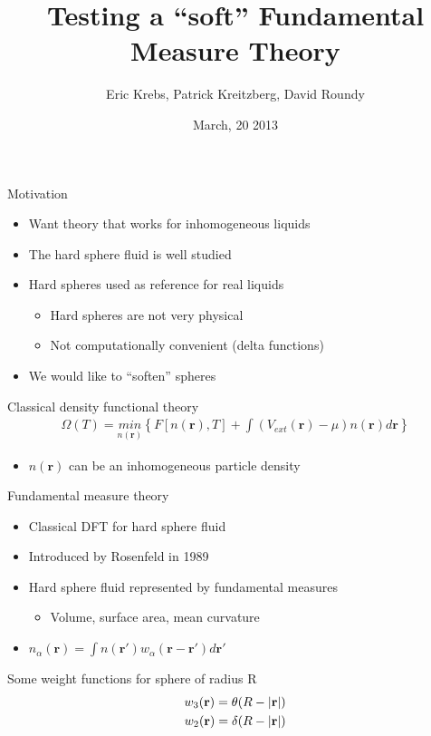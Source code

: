 \documentclass{beamer}
\title[Testing Soft FMT]{Testing a ``soft'' Fundamental Measure Theory}
\author{Eric Krebs, Patrick Kreitzberg, David Roundy}
\institute{Oregon State University}
\date{March, 20 2013}
\newcommand{\rr}{\textbf{r}}
\begin{document}
\begin{frame}
 \titlepage
\end{frame}

\begin{frame}{Motivation}
  \begin{itemize}
    \item Want theory that works for inhomogeneous liquids
    \item The hard sphere fluid is well studied
    \item Hard spheres used as reference for real liquids
      \begin{itemize}
        \item Hard spheres are not very physical
        \item Not computationally convenient (delta functions)
      \end{itemize}
    \item We would like to ``soften'' spheres
  \end{itemize}
  \begin{block}{Classical density functional theory}
    \begin{align}
    \Omega(T) = \underset{n(\rr)}{min} \left\{F[n(\rr),T] + \int
                \left(V_{ext}(\rr) - \mu \right)n(\rr)d\rr \right\}
    \end{align}
    \begin{itemize}
      \item $n(\rr)$ can be an inhomogeneous particle density
    \end{itemize}
  \end{block}
\end{frame}

\begin{frame}{Fundamental measure theory}
  \begin{itemize}
    \item Classical DFT for hard sphere fluid
    \item Introduced by Rosenfeld in 1989
    \item Hard sphere fluid represented by fundamental measures
    \begin{itemize}
      \item Volume, surface area, mean curvature
    \end{itemize}
    \item $n_{\alpha}(\rr) = \int n(\rr')w_{\alpha}(\rr - \rr')d\rr'$
  \end{itemize}
  \begin{block}{Some weight functions for sphere of radius R}
    \begin{align}
      w_3(\rr) = \theta (R - |\rr|) \\
      w_2(\rr) = \delta (R - |\rr|) \\
      \notag
    \end{align}
  \end{block}
\end{frame}
\end{document}
